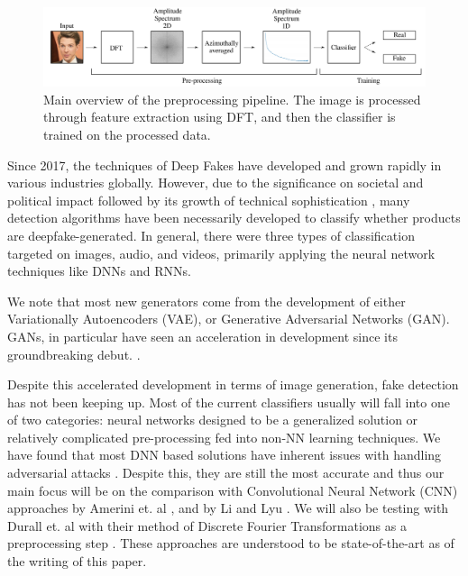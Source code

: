 \documentclass[11pt,twocolumn,letterpaper]{article}
\begin{document}
\begin{figure}
    \includegraphics[width=\textwidth]{preprocessing-pipeline}
    \caption{Main overview of the preprocessing pipeline. The image is processed through feature extraction using DFT, and then the classifier is trained on the processed data.}
\end{figure}
Since 2017, the techniques of Deep Fakes have developed and grown rapidly in various industries globally. However, due to the significance on societal and political impact followed by its growth of technical sophistication \cite{stateOfDeepFakes}, many detection algorithms have been necessarily developed to classify whether products are deepfake-generated. In general, there were three types of classification targeted on images, audio, and videos, primarily applying the neural network techniques like DNNs and RNNs. \par
We note that most new generators come from the development of either Variationally Autoencoders (VAE)\cite{kingma2013autoencoding}, or Generative Adversarial Networks (GAN)\cite{goodfellow2014generative}. GANs, in particular have seen an acceleration in development since its groundbreaking debut. \cite{brock2018large}\cite{karras2017progressive}.\par
Despite this accelerated development in terms of image generation, fake detection has not been keeping up. Most of the current classifiers usually will fall into one of two categories: neural networks designed to be a generalized solution or relatively complicated pre-processing fed into non-NN learning techniques. We have found that most DNN based solutions have inherent issues with handling adversarial attacks \cite{neekhara2020adversarial}. Despite this, they are still the most accurate and thus our main focus will be on the comparison with Convolutional Neural Network (CNN) approaches by Amerini et. al \cite{Amerini_2019_ICCV}, and by Li and Lyu \cite{li2018exposing}. We will also be testing with Durall et. al with their method of Discrete Fourier Transformations as a preprocessing step \cite{durall2019unmasking}. These approaches are understood to be state-of-the-art as of the writing of this paper. \par
\end{document}
